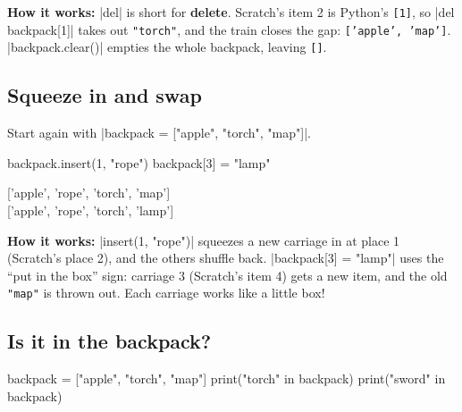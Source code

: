 \textbf{How it works:} \py|del| is short for \textbf{delete}. Scratch's item 2 is Python's \texttt{[1]}, so \py|del backpack[1]| takes out \texttt{"torch"}, and the train closes the gap: \texttt{['apple', 'map']}. \py|backpack.clear()| empties the whole backpack, leaving \texttt{[]}.

\subsection*{Squeeze in and swap}

Start again with \py|backpack = ["apple", "torch", "map"]|.

\begin{center}
\begin{scratch}
\end{scratch}
\end{center}
\begin{code}
backpack.insert(1, "rope")
backpack[3] = "lamp"
\end{code}

\begin{outputbox}
{[}'apple', 'rope', 'torch', 'map']\\
{[}'apple', 'rope', 'torch', 'lamp']
\end{outputbox}

\textbf{How it works:} \py|insert(1, "rope")| squeezes a new carriage in at place 1 (Scratch's place 2), and the others shuffle back. \py|backpack[3] = "lamp"| uses the ``put in the box'' sign: carriage 3 (Scratch's item 4) gets a new item, and the old \texttt{"map"} is thrown out. Each carriage works like a little box!

\subsection*{Is it in the backpack?}

\begin{center}
\begin{scratch}
\end{scratch}
\end{center}
\begin{code}
backpack = ["apple", "torch", "map"]
print("torch" in backpack)
print("sword" in backpack)
\end{code}

